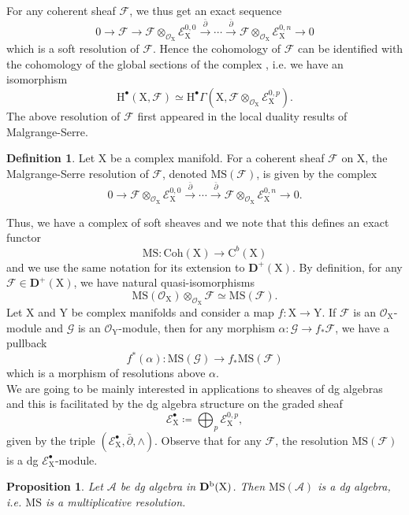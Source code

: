 \documentclass{article}
\theoremstyle{plain}
\newtheorem{proposition}[theorem]{Proposition}
\theoremstyle{definition}
\newtheorem{definition}[theorem]{Definition}
\theoremstyle{remark}
\newcommand{\Db}{{\mathrm{\bf{D}}}^{\mr{b}}}
\newcommand{\mr}{\mathrm}
\newcommand{\MS}{\mr{MS}}
\newcommand{\3}{\vspace{3mm}}
\newcommand{\2}{\vspace{2mm}}
\newcommand{\1}{\vspace{1mm}}
\newcommand{\E}{\mathscr E}
\newcommand{\F}{\mathscr{F}}
\begin{document}
For any coherent sheaf $\mathscr{F}$, we thus get an exact sequence \begin{equation}\label{soft}
 0\to \mathscr{F} \to \mathscr{F}\otimes_{\mathscr{O}_\mr{X}}\mathscr{E}_\mr{X}^{0,0} \xrightarrow{\bar{\partial}} \cdots \xrightarrow{\bar{\partial}} \mathscr{F}\otimes_{\mathscr{O}_\mr{X}}\mathscr{E}_\mr{X}^{0,n}\to 0
 \end{equation} which is a soft resolution of $\mathscr{F}$. Hence the cohomology of $\mathscr{F}$ can be identified with the cohomology of the global sections of the complex , i.e. we have an isomorphism $$\mr{H}^{\bullet}(\mr{X},\mathscr{F}) \simeq \mr{H}^{\bullet}\Gamma(\mr{X},\mathscr{F}\otimes_{\mathscr{O}_\mr{X}}\mathscr{E}_\mr{X}^{0,p}).$$
The above resolution of $\mathscr{F}$ first appeared in the local duality results of Malgrange-Serre.
\2
\begin{definition}
Let $\mr{X}$ be a complex manifold. For a coherent sheaf $\F$ on $\mr{X}$, the Malgrange-Serre resolution of $\F$, denoted $\MS(\F)$, is given by the complex $$0\to \mathscr{F}\otimes_{\mathscr{O}_\mr{X}}\mathscr{E}_\mr{X}^{0,0}\xrightarrow{\bar{\partial}} \cdots \xrightarrow{\bar{\partial}} \mathscr{F}\otimes_{\mathscr{O}_\mr{X}}\mathscr{E}_\mr{X}^{0,n}\to 0.$$
\end{definition}

Thus, we have a complex of soft sheaves and we note that this defines an exact functor $$\MS:\mr{Coh}(\mr{X})\to \mr{C}^{b}(\mr{X})$$ and we use the same notation for its extension to $\mathbf{D}^{+}(\mr{X})$. By definition, for any $\mathscr{F} \in \mathbf{D}^{+}(\mr{X})$, we have natural quasi-isomorphisms $$\MS(\mathscr{O}_\mr{X})\otimes_{\mathscr{O}_\mr{X}}\mathscr{F}\simeq \MS(\mathscr{F}).$$
Let $\mr{X}$ and $\mr{Y}$ be complex manifolds and consider a map $f:\mr{X}\to \mr{Y}$. If $\mathscr{F}$ is an $\mathscr{O}_\mr{X}$-module  and $\mathscr{G}$ is an $\mathscr{O}_\mr{Y}$-module, then for any morphism $\alpha:\mathscr{G}\to f_*\mathscr{F}$, we have a pullback $$f^*(\alpha):\MS(\mathscr{G})\to f_*\MS(\mathscr{F})$$ which is a morphism of resolutions above $\alpha$.\\
We are going to be mainly interested in applications to sheaves of dg algebras and this is facilitated by the dg algebra structure on the graded sheaf $$\E_\mr{X}^{\bullet} \coloneqq \bigoplus_p\E_\mr{X}^{0,p},$$ given by the triple $(\E_\mr{X}^{\bullet},\bar{\partial},\wedge)$. Observe that for any $\mathscr{F}$, the resolution $\MS(\mathscr{F})$ is a dg $\mathscr{E}_\mr{X}^\bullet$-module.
\2
\begin{proposition}
Let $\mathscr{A}$ be dg algebra in $\Db(\mr{X})$. Then $\MS(\mathscr{A})$ is a dg algebra, i.e. $\MS$ is a multiplicative resolution.
\end{proposition}
\end{document}
